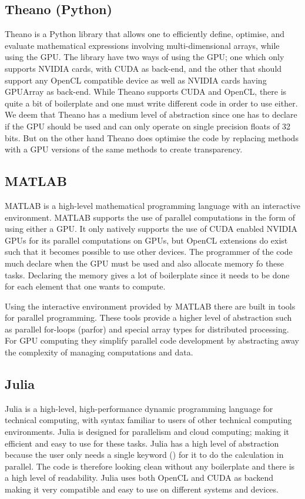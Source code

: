 \subsection{Theano (Python)}
Theano is a Python library that allows one to efficiently define, optimise, and evaluate mathematical expressions involving multi-dimensional arrays, while using the GPU.
The library have two ways of using the GPU; one which only supports NVIDIA cards, with CUDA as back-end, and the other that should support any OpenCL compatible device as well as NVIDIA cards having GPUArray as back-end.
While Theano supports CUDA and OpenCL, there is quite a bit of boilerplate and one must write different code in order to use either.
We deem that Theano has a medium level of abstraction since one has to declare if the GPU should be used and can only operate on single precision floats of 32 bits.
But on the other hand Theano does optimise the code by replacing methods with a GPU versions of the same methods to create transparency.\citep{Theano,Theano_GPU}

\subsection{MATLAB}
MATLAB is a high-level mathematical programming language with an interactive environment.
MATLAB supports the use of parallel computations in the form of using either a GPU.
It only natively supports the use of CUDA enabled NVIDIA GPUs for its parallel computations on GPUs, but OpenCL extensions do exist such that it becomes possible to use other devices.
The programmer of the code much declare when the GPU must be used and also allocate memory fo these tasks.
Declaring the memory gives a lot of boilerplate since it needs to be done for each element that one wants to compute.\citep{MATLAB_backend,MATLAB_benchmark,}

Using the interactive environment provided by MATLAB there are built in tools for parallel programming.
These tools provide a higher level of abstraction such as parallel for-loops (parfor) and special array types for distributed processing.
For GPU computing they simplify parallel code development by abstracting away the complexity of managing computations and data.\citep{MATLAB_parallel}

\subsection{Julia}
Julia is a high-level, high-performance dynamic programming language for technical computing, with syntax familiar to users of other technical computing environments.
Julia is designed for parallelism and cloud computing; making it efficient and easy to use for these tasks.
Julia has a high level of abstraction because the user only needs a single keyword (\@parallel) for it to do the calculation in parallel.
The code is therefore looking clean without any boilerplate and there is a high level of readability.
Julia uses both OpenCL and CUDA as backend making it very compatible and easy to use on different systems and devices.\citep{Julia_Git,Julia}

